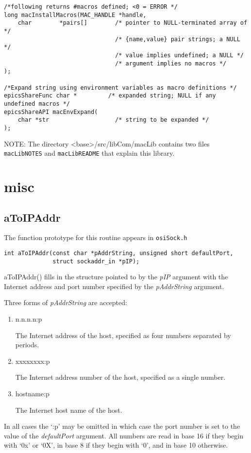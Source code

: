 \begin{verbatim}
/*following returns #macros defined; <0 = ERROR */
long macInstallMacros(MAC_HANDLE *handle,
    char        *pairs[]        /* pointer to NULL-terminated array of */
                                /* {name,value} pair strings; a NULL */
                                /* value implies undefined; a NULL */
                                /* argument implies no macros */
);

/*Expand string using environment variables as macro definitions */
epicsShareFunc char *         /* expanded string; NULL if any undefined macros */
epicsShareAPI macEnvExpand(
    char *str                   /* string to be expanded */
);
\end{verbatim}
NOTE: The directory \textless{}base\textgreater{}/src/libCom/macLib contains two files \verb|macLibNOTES| and \verb|macLibREADME| that explain 
this library.

\section{misc}

\subsection{aToIPAddr}

The function prototype for this routine appears in \verb|osiSock.h|

\begin{verbatim}int aToIPAddr(const char *pAddrString, unsigned short defaultPort,
              struct sockaddr_in *pIP);
\end{verbatim}aToIPAddr() fills in the structure pointed to by the \emph{pIP} argument with the Internet address and port number specified by 
the \emph{pAddrString} argument. 

Three forms of \emph{pAddrString} are accepted: 

\begin{enumerate}\item n.n.n.n:p 

The Internet address of the host, specified as four numbers separated by periods. 

\item xxxxxxxx:p 

The Internet address number of the host, specified as a single number. 

\item hostname:p 

The Internet host name of the host.

\end{enumerate}In all cases the `:p' may be omitted in which case the port number is set to the value of the \emph{defaultPort} argument. All 
numbers are read in base 16 if they begin with `0x' or `0X', in base 8 if they begin with `0', and in base 10 otherwise. 


